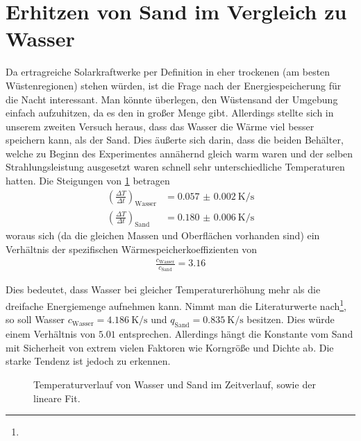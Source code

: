 \documentclass[12pt,a4paper,titlepage,headinclude,bibtotoc]{scrartcl}
\begin{document}
\section{Erhitzen von Sand im Vergleich zu Wasser}
Da ertragreiche Solarkraftwerke per Definition in eher trockenen (am besten Wüstenregionen) stehen würden, ist die Frage nach der Energiespeicherung für die Nacht interessant.
Man könnte überlegen, den Wüstensand der Umgebung einfach aufzuhitzen, da es den in großer Menge gibt.
Allerdings stellte sich in unserem zweiten Versuch heraus, dass das Wasser die Wärme viel besser speichern kann, als der Sand.
Dies äußerte sich darin, dass die beiden Behälter, welche zu Beginn des Experimentes annähernd gleich warm waren und der selben Strahlungsleistung ausgesetzt waren schnell sehr unterschiedliche Temperaturen hatten.
Die Steigungen von \ref{fig:wassersand} betragen
\begin{align*}
	\left( \frac{\Delta T}{\Delta t} \right)_\text{Wasser}&=\SI{0.057(2)}{\kelvin \per \second}\\
	\left( \frac{\Delta T}{\Delta t} \right)_\text{Sand}&=\SI{0.180(6)}{\kelvin \per \second}
\end{align*}
woraus sich (da die gleichen Massen und Oberflächen vorhanden sind) ein Verhältnis der spezifischen Wärmespeicherkoeffizienten von
\begin{align*}
	\frac{c_\text{Wasser}}{c_\text{Sand}}=3.16
\end{align*}

Dies bedeutet, dass Wasser bei gleicher Temperaturerhöhung mehr als die dreifache Energiemenge aufnehmen kann.
Nimmt man die Literaturwerte nach\footnote{\spezWaerme}, so soll Wasser $c_\text{Wasser}=\SI{4.186}{\kelvin \per \second}$ und $q_\text{Sand}=\SI{0.835}{\kelvin \per \second}$ besitzen.
Dies würde einem Verhältnis von $5.01$ entsprechen.
Allerdings hängt die Konstante vom Sand mit Sicherheit von extrem vielen Faktoren wie Korngröße und Dichte ab.
Die starke Tendenz ist jedoch zu erkennen.

\begin{figure}[h]
	\centering
	
	\caption{Temperaturverlauf von Wasser und Sand im Zeitverlauf, sowie der lineare Fit.}
	\label{fig:wassersand}
\end{figure}
\end{document}
